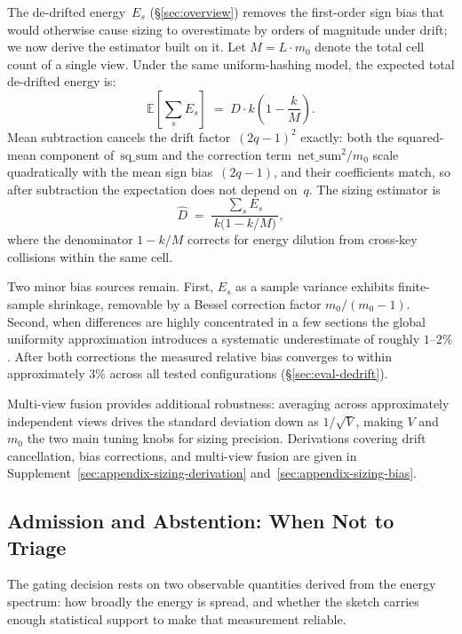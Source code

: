 The de-drifted energy~$E_s$ (\S\ref{sec:overview}) removes
the first-order sign bias that would otherwise cause sizing
to overestimate by orders of magnitude under drift; we now
derive the estimator built on it.
Let $M = L \cdot m_0$ denote the total cell count
of a single view.
Under the same uniform-hashing model, the expected total
de-drifted energy is:
\[
\mathbb{E}\!\left[\sum_s E_s\right]
  \;=\; D \cdot k\!\left(1 - \frac{k}{M}\right).
\]
Mean subtraction cancels the drift factor~$(2q{-}1)^2$
exactly: both the squared-mean component of~$\mathrm{sq\_sum}$
and the correction term~$\mathrm{net\_sum}^{2}/m_0$ scale
quadratically with the mean sign bias~$(2q{-}1)$, and their
coefficients match, so after subtraction the expectation does
not depend on~$q$.
The sizing estimator is
\[
  \hat{D} \;=\; \frac{\sum_s E_s}{\,k\bigl(1 - k/M\bigr)\,},
\]
where the denominator $1{-}k/M$ corrects for energy dilution
from cross-key collisions within the same cell.

Two minor bias sources remain.
First, $E_s$ as a sample variance exhibits finite-sample
shrinkage, removable by a Bessel correction factor
$m_0/(m_0{-}1)$.
Second, when differences are highly concentrated in a few
sections the global uniformity approximation introduces a
systematic underestimate of roughly $1$--$2\%$.
After both corrections the measured relative bias converges to
within approximately $3\%$ across all tested configurations (\S\ref{sec:eval-dedrift}).

Multi-view fusion provides additional robustness:
averaging across approximately independent views drives
the standard deviation down as $1/\sqrt{V}$, making $V$
and $m_0$ the two main tuning knobs for sizing precision.
Derivations covering drift cancellation, bias
corrections, and multi-view fusion are given in
Supplement~\ref{sec:appendix-sizing-derivation}
and~\ref{sec:appendix-sizing-bias}.


\subsection{Admission and Abstention: When Not to Triage}
\label{sec:gating}

The gating decision rests on two observable quantities
derived from the energy spectrum: how broadly the energy is
spread, and whether the sketch carries enough statistical
support to make that measurement reliable.

